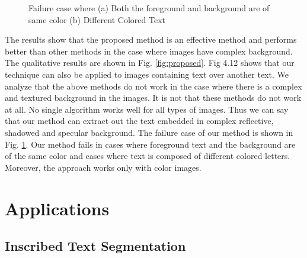 \begin{figure}[t]
{}
\caption
{Failure case where (a) Both the foreground and background are
of same color (b) Different Colored Text}
\label{fig:failure}
\end{figure}

The results show that the proposed method is an effective method and performs better than other methods 
in the case where images have
complex background. The qualitative results are shown in Fig. \ref{fig:proposed}. Fig 4.12 shows that our 
technique can
also be applied to images containing text over another text. 
We analyze that the above methods do not work in the case where there is a complex and textured background in the images.
It is not that these methods do not work at all. No single algorithm works well for all types of images. Thus we can say
that our method can extract out the text embedded in complex reflective, shadowed and
specular background.
The failure case of our method is shown in Fig. \ref{fig:failure}.
Our method fails in cases where foreground text and the background are of the same color
and cases where text is composed of different colored letters.
Moreover, the approach works only with color images.

\section{Applications}

\subsection{Inscribed Text Segmentation}

